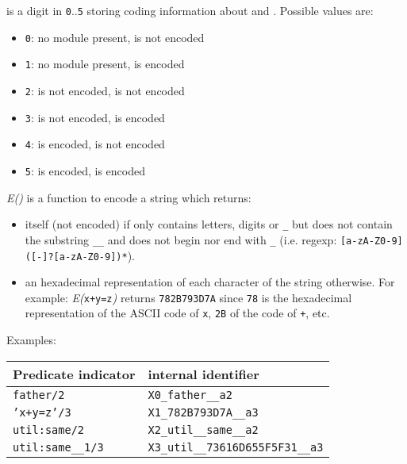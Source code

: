 \begin{description}

\item {} is a digit in \texttt{0}..\texttt{5} storing coding information about  and . Possible values are:

\begin{itemize}

  \item \texttt{0}: no module present,              is not encoded
  \item \texttt{1}: no module present,              is encoded
  \item \texttt{2}:  is not encoded,  is not encoded
  \item \texttt{3}:  is not encoded,  is encoded
  \item \texttt{4}:  is encoded,      is not encoded
  \item \texttt{5}:  is encoded,      is encoded

\end{itemize}

\item \textit{E()} is a function to encode a string  which returns:

\begin{itemize}

  \item {} itself (not encoded) if  only contains letters, digits or \texttt{\_} but does not contain the substring \texttt{\_\_} and does not begin nor end with \texttt{\_} (i.e. regexp: \texttt{[a-zA-Z0-9]([-]?[a-zA-Z0-9])*}).

\item an hexadecimal representation of each character of the string otherwise. For example: \textit{E(}\texttt{x+y=z}\textit{)} returns \texttt{782B793D7A} since
\texttt{78} is the hexadecimal representation of the ASCII code of \texttt{x},
\texttt{2B} of the code of \texttt{+}, etc.

\end{itemize}

\end{description}

Examples: 

\begin{center}
\begin{tabular}{l|l}

Predicate indicator   & internal identifier \\
\hline
\texttt{father/2}     & \texttt{X0\_father\_\_a2} \\
\texttt{'x+y=z'/3}    & \texttt{X1\_782B793D7A\_\_a3} \\
\texttt{util:same/2}  & \texttt{X2\_util\_\_same\_\_a2} \\
\texttt{util:same\_\_1/3} & \texttt{X3\_util\_\_73616D655F5F31\_\_a3} \\

\end{tabular}
\end{center}

